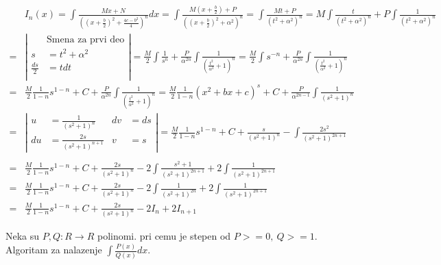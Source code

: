 \documentclass{article}
\begin{document}
\begin{align*}
      & I_n (x) = \int \frac{Mx + N}{((x+\frac{b}{2})^2 + \frac{4c-b^2}{4})^n}dx
    = \int \frac{M(x+\frac{b}{2}) + P}{((x+\frac{b}{2})^2 + \alpha^2)^n}
    = \int \frac{Mt + P}{(t^2 + \alpha ^2)^n}
    = M\int\frac{t}{(t^2+\alpha^2)^n} + P\int\frac{1}{(t^2 + \alpha^2)^n}                                                           \\
    = & \left | \begin{alignedat}{3}
                                 & \text{Smena za prvi deo} \\
                    s            & = t^2 + \alpha^2         \\
                    \frac{ds}{2} & = t dt                   \\
                \end{alignedat} \right |
    = \frac{M}{2} \int \frac{1}{s^n} + \frac{P}{\alpha^{2n}}\int\frac{1}{(\frac{t^2}{\alpha^2} + 1)^n}=
    \frac{M}{2}\int s^{-n} + \frac{P}{\alpha^{2n}}\int\frac{1}{(\frac{t^2}{\alpha^2} + 1)^n}                                        \\ = &
    \frac{M}{2} \frac{1}{1-n}s^{1-n} + C + \frac{P}{\alpha^{2n}}\int\frac{1}{(\frac{t^2}{\alpha^2} + 1)^n}
    = \frac{M}{2}\frac{1}{1-n}(x^2+bx + c)^s + C + \frac{P}{\alpha^{2n-1}}\int\frac{1}{(s^2 + 1)^n}                                 \\
    = & \left | \begin{alignedat}{2}
                    u  & = \frac{1}{(s^2+1)^n}      & dv & = ds \\
                    du & = \frac{2s}{(s^2+1)^{n+1}} & v  & = s
                \end{alignedat} \right |
    = \frac{M}{2} \frac{1}{1-n}s^{1-n} + C + \frac{s}{(s^2 + 1)^n} - \int\frac{2s^2}{(s^2+1)^{2n+1}}                                \\
    \\ = & \frac{M}{2} \frac{1}{1-n}s^{1-n} + C + \frac{2s}{(s^2 + 1)^n} - 2\int\frac{s^2 + 1}{(s^2+1)^{2n+1}} + 2\int\frac{1}{(s^2+1)^{2n+1}}\\
    = & \frac{M}{2} \frac{1}{1-n}s^{1-n} + C + \frac{2s}{(s^2 + 1)^n} - 2\int\frac{1}{(s^2+1)^{2n}} + 2\int\frac{1}{(s^2+1)^{2n+1}} \\
    = & \frac{M}{2} \frac{1}{1-n}s^{1-n} + C + \frac{2s}{(s^2 + 1)^n} - 2I_n + 2I_{n+1}
\end{align*}
\begin{primbox}
    Neka su $P, Q: R \longrightarrow R$ polinomi. pri cemu je stepen od $P >= 0,\ Q >= 1$.
    Algoritam za nalazenje $\int \frac{P(x)}{Q(x)}dx$.
\end{primbox}
\end{document}
